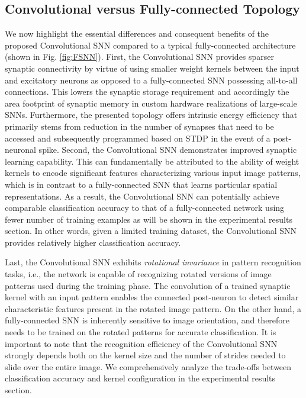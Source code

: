 \documentclass[journal, onecolumn]{IEEEtran}
\begin{document}
\subsection*{\normalsize\bf{Convolutional versus Fully-connected Topology}}
We now highlight the essential differences and consequent benefits of the proposed Convolutional SNN compared to a typical fully-connected architecture (shown in Fig. \ref{fig:FSNN}). First, the Convolutional SNN provides sparser synaptic connectivity by virtue of using smaller weight kernels between the input and excitatory neurons as opposed to a fully-connected SNN possessing all-to-all connections. This lowers the synaptic storage requirement and accordingly the area footprint of synaptic memory in custom hardware realizations of large-scale SNNs. Furthermore, the presented topology offers intrinsic energy efficiency that primarily stems from reduction in the number of synapses that need to be accessed and subsequently programmed based on STDP in the event of a post-neuronal spike. Second, the Convolutional SNN demonstrates improved synaptic learning capability. This can fundamentally be attributed to the ability of weight kernels to encode significant features characterizing various input image patterns, which is in contrast to a fully-connected SNN that learns particular spatial representations. As a result, the Convolutional SNN can potentially achieve comparable classification accuracy to that of a fully-connected network using fewer number of training examples as will be shown in the experimental results section. In other words, given a limited training dataset, the Convolutional SNN provides relatively higher classification accuracy.

Last, the Convolutional SNN exhibits \textit{rotational invariance} in pattern recognition tasks, i.e., the network is capable of recognizing rotated versions of image patterns used during the training phase. The convolution of a trained synaptic kernel with an input pattern enables the connected post-neuron to detect similar characteristic features present in the rotated image pattern. On the other hand, a fully-connected SNN is inherently sensitive to image orientation, and therefore needs to be trained on the rotated patterns for accurate classification. It is important to note that the recognition efficiency of the Convolutional SNN strongly depends both on the kernel size and the number of strides needed to slide over the entire image. We comprehensively analyze the trade-offs between classification accuracy and kernel configuration in the experimental results section.
\end{document}
